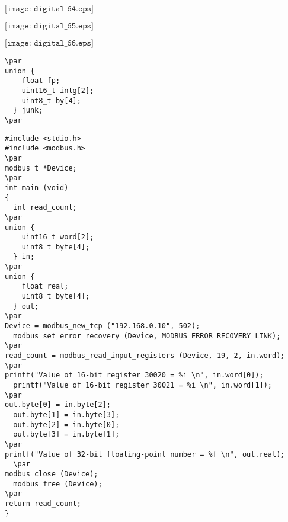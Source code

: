 \documentclass[12pt,a4paper,margin=2cm]{book}
\def\lthtmlcheckvsize{\ifdim\ht\sizebox<\vsize 
  \ifdim\wd\sizebox<\hsize\expandafter\hfill\fi \expandafter\vfill
  \else\expandafter\vss\fi}%
\begin{document}
{\newpage\clearpage
{}%
$\displaystyle \texttt{[image: digital\_64.eps]}$%
\lthtmlindisplaymathZ
\lthtmlcheckvsize\clearpage}

{\newpage\clearpage
{}%
$\displaystyle \texttt{[image: digital\_65.eps]}$%
\lthtmlindisplaymathZ
\lthtmlcheckvsize\clearpage}

{\newpage\clearpage
{}%
$\displaystyle \texttt{[image: digital\_66.eps]}$%
\lthtmlindisplaymathZ
\lthtmlcheckvsize\clearpage}

{\newpage\clearpage
{}%
\begin{lstlisting}
\par
union {
    float fp;
    uint16_t intg[2];
    uint8_t by[4];
  } junk;
\par
\end{lstlisting}%
\lthtmlfigureZ
\lthtmlcheckvsize\clearpage}

{\newpage\clearpage
{}%
\begin{lstlisting}
#include <stdio.h>
#include <modbus.h>
\par
modbus_t *Device;
\par
int main (void)
{
  int read_count;
\par
union {
    uint16_t word[2];
    uint8_t byte[4];
  } in;
\par
union {
    float real;
    uint8_t byte[4];
  } out;
\par
Device = modbus_new_tcp ("192.168.0.10", 502);
  modbus_set_error_recovery (Device, MODBUS_ERROR_RECOVERY_LINK);
\par
read_count = modbus_read_input_registers (Device, 19, 2, in.word);
\par
printf("Value of 16-bit register 30020 = %i \n", in.word[0]);
  printf("Value of 16-bit register 30021 = %i \n", in.word[1]);
\par
out.byte[0] = in.byte[2];
  out.byte[1] = in.byte[3];
  out.byte[2] = in.byte[0];
  out.byte[3] = in.byte[1];
\par
printf("Value of 32-bit floating-point number = %f \n", out.real);
  \par
modbus_close (Device);
  modbus_free (Device);
\par
return read_count;
}
\end{lstlisting}%
\lthtmlfigureZ
\lthtmlcheckvsize\clearpage}
\end{document}
